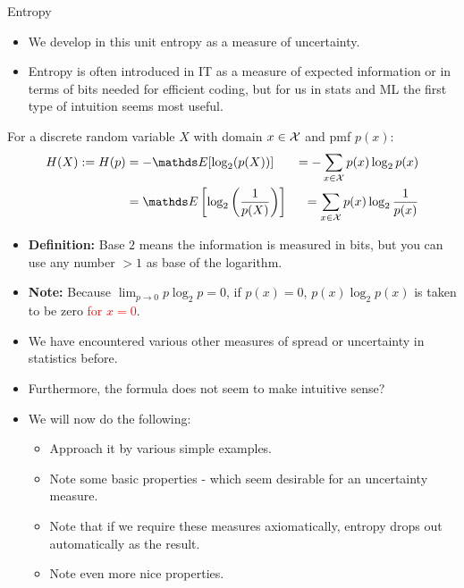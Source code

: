 \begin{vbframe}{Entropy}
\begin{itemize}
  \item We develop in this unit entropy as a measure of uncertainty.
  \item Entropy is often introduced in IT as a measure of
    expected information or in terms of bits needed for efficient coding, 
  but for us in stats and ML the first type of intuition seems most useful.
\end{itemize}


For a discrete random variable $X$ with domain $x \in \mathcal{X}$ and pmf $p(x)$:
\begin{equation*}
\begin{aligned} 
  H(X) := H(p) &= - \E[\log_2(p(X))]           &= -\sum_{x \in \Xspace} p(x) \log_2 p(x)\\ 
               &=   \E\left[\log_2\left(\frac{1}{p(X)}\right)\right] &= \sum_{x \in \Xspace} p(x) \log_2 \frac{1}{p(x)} 
\end{aligned} 
\end{equation*}
    \begin{itemize}
  \item \textbf{Definition:}
Base $2$ means the information is measured in bits, but you can use any number $>1$ as base of the logarithm.
    \item \textbf{Note:} Because $\lim _{p \rightarrow 0} p \log_2 p=0$, if $p(x) = 0$, $p(x) \log_2 p(x)$ is taken to be zero \textcolor{red}{for $x=0$}.
  \end{itemize}

\framebreak

\begin{itemize}
    \item We have encountered various other measures of spread or uncertainty in statistics before.
    \item Furthermore, the formula does not seem to make intuitive sense?
    \item We will now do the following:
    \begin{itemize}
      \item Approach it by various simple examples.
      \item Note some basic properties - which seem desirable for an uncertainty measure.
      \item Note that if we require these measures axiomatically, entropy drops out automatically as the result.
      \item Note even more nice properties.
  \end{itemize}
\end{itemize}
\end{vbframe}


